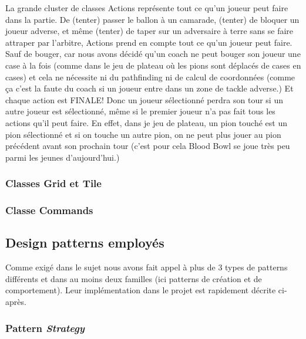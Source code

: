 \documentclass{article}
\newcommand{\pattern}{\emph}
\begin{document}
            La grande cluster de classes Actions représente tout ce qu'un joueur peut faire dans la partie. De (tenter) passer le ballon à un camarade, (tenter) de bloquer un joueur adverse, et même (tenter) de taper sur un adversaire à terre sans se faire attraper par l'arbitre, Actions prend en compte tout ce qu'un joueur peut faire. Sauf de bouger, car nous avons décidé qu'un coach ne peut bouger son joueur une case à la fois (comme dans le jeu de plateau où les pions sont déplacés de cases en cases) et cela ne nécessite ni du pathfinding ni de calcul de coordonnées (comme ça c'est la faute du coach si un joueur entre dans un zone de tackle adverse.) Et chaque action est FINALE! Donc un joueur sélectionné perdra son tour si un autre joueur est sélectionné, même si le premier joueur n'a pas fait tous les actions qu'il peut faire. En effet, dans je jeu de plateau, un pion touché est un pion sélectionné et si on touche un autre pion, on ne peut plus jouer au pion précédent avant son prochain tour (c'est pour cela Blood Bowl se joue très peu parmi les jeunes d'aujourd'hui.)
        
        \subsubsection{Classes Grid et Tile}
        
        \subsubsection{Classe Commands}
        

    \subsection{Design patterns employés}
        
        Comme exigé dans le sujet nous avons fait appel à plus de 3 types de patterns différents et dans au moins deux familles (ici patterns de création et de comportement). Leur implémentation dans le projet est rapidement décrite ci-après.
        
        \subsubsection{Pattern \pattern{Strategy}}
            
\end{document}
